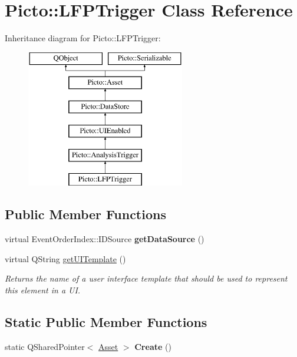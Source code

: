\hypertarget{class_picto_1_1_l_f_p_trigger}{\section{Picto\-:\-:L\-F\-P\-Trigger Class Reference}
\label{class_picto_1_1_l_f_p_trigger}
}
Inheritance diagram for Picto\-:\-:L\-F\-P\-Trigger\-:\begin{figure}[H]
\begin{center}
\leavevmode
\includegraphics[height=6.000000cm]{class_picto_1_1_l_f_p_trigger}
\end{center}
\end{figure}
\subsection*{Public Member Functions}
\begin{DoxyCompactItemize}
\item 
\hypertarget{class_picto_1_1_l_f_p_trigger_a7af59d09a91edb562c247fcfdd90a396}{virtual Event\-Order\-Index\-::\-I\-D\-Source {\bfseries get\-Data\-Source} ()}\label{class_picto_1_1_l_f_p_trigger_a7af59d09a91edb562c247fcfdd90a396}

\item 
\hypertarget{class_picto_1_1_l_f_p_trigger_a94b4c2320afbde6d72bb2b60656a0ea9}{virtual Q\-String \hyperlink{class_picto_1_1_l_f_p_trigger_a94b4c2320afbde6d72bb2b60656a0ea9}{get\-U\-I\-Template} ()}\label{class_picto_1_1_l_f_p_trigger_a94b4c2320afbde6d72bb2b60656a0ea9}

\begin{DoxyCompactList}\small\item\em Returns the name of a user interface template that should be used to represent this element in a U\-I. \end{DoxyCompactList}\end{DoxyCompactItemize}
\subsection*{Static Public Member Functions}
\begin{DoxyCompactItemize}
\item 
\hypertarget{class_picto_1_1_l_f_p_trigger_ae235062fae0329bd5383650ae97e4e0e}{static Q\-Shared\-Pointer$<$ \hyperlink{class_picto_1_1_asset}{Asset} $>$ {\bfseries Create} ()}\label{class_picto_1_1_l_f_p_trigger_ae235062fae0329bd5383650ae97e4e0e}

\end{DoxyCompactItemize}
